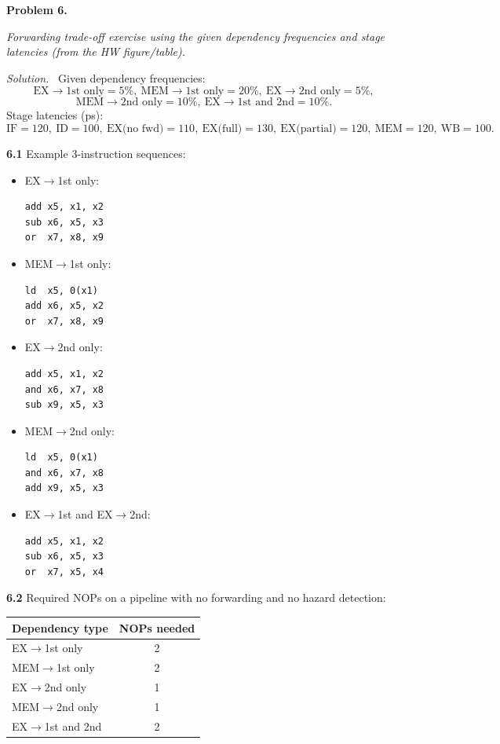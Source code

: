 \documentclass[12pt]{article}
\newcommand{\problem}[1]{\vspace{0.8em}\noindent\textbf{Problem #1.}\vspace{0.35em}}
\newenvironment{solution}{\par\noindent\textit{Solution.}\ }{\par\vspace{1.1em}}
\newcommand{\subproblem}[1]{\par\vspace{0.45em}\noindent\textbf{#1}\quad}
\newcommand{\assigntext}[1]{\par\vspace{0.25em}\small\textit{#1}\par\vspace{0.35em}}
\begin{document}
\problem{6}
\assigntext{Forwarding trade-off exercise using the given dependency frequencies and stage latencies (from the HW figure/table).}

\begin{solution}
Given dependency frequencies:
\[
\text{EX}\rightarrow \text{1st only}=5\%,\ 
\text{MEM}\rightarrow \text{1st only}=20\%,\ 
\text{EX}\rightarrow \text{2nd only}=5\%,
\]
\[
\text{MEM}\rightarrow \text{2nd only}=10\%,\ 
\text{EX}\rightarrow \text{1st and 2nd}=10\%.
\]
Stage latencies (ps):
\[
\text{IF}=120,\ \text{ID}=100,\ \text{EX(no fwd)}=110,\ \text{EX(full)}=130,\ \text{EX(partial)}=120,\ \text{MEM}=120,\ \text{WB}=100.
\]

\subproblem{6.1}
Example 3-instruction sequences:
\begin{itemize}
\item EX$\rightarrow$1st only:
\begin{verbatim}
add x5, x1, x2
sub x6, x5, x3
or  x7, x8, x9
\end{verbatim}
\item MEM$\rightarrow$1st only:
\begin{verbatim}
ld  x5, 0(x1)
add x6, x5, x2
or  x7, x8, x9
\end{verbatim}
\item EX$\rightarrow$2nd only:
\begin{verbatim}
add x5, x1, x2
and x6, x7, x8
sub x9, x5, x3
\end{verbatim}
\item MEM$\rightarrow$2nd only:
\begin{verbatim}
ld  x5, 0(x1)
and x6, x7, x8
add x9, x5, x3
\end{verbatim}
\item EX$\rightarrow$1st and EX$\rightarrow$2nd:
\begin{verbatim}
add x5, x1, x2
sub x6, x5, x3
or  x7, x5, x4
\end{verbatim}
\end{itemize}

\subproblem{6.2}
Required NOPs on a pipeline with no forwarding and no hazard detection:
\begin{center}
\begin{tabular}{@{}lc@{}}
\toprule
Dependency type & NOPs needed \\
\midrule
EX$\rightarrow$1st only & 2 \\
MEM$\rightarrow$1st only & 2 \\
EX$\rightarrow$2nd only & 1 \\
MEM$\rightarrow$2nd only & 1 \\
EX$\rightarrow$1st and 2nd & 2 \\
\bottomrule
\end{tabular}
\end{center}


\end{solution}
\end{document}
